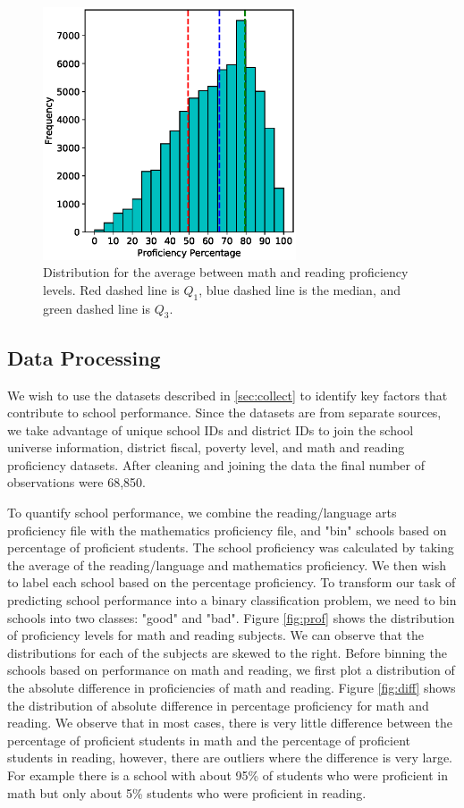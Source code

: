 \begin{figure} 
	\includegraphics[width=7.5cm]{images/prof_avg}
	\caption{Distribution for the average between math and reading proficiency levels. Red dashed line is $Q_1$, blue dashed line is the median, and green dashed line is $Q_3$.}
	\label{fig:avgprof}
\end{figure}

\subsection{Data Processing} \label{sec:processing}

We wish to use the datasets described in \ref{sec:collect} to identify key factors that contribute to school performance. Since the datasets are from separate sources, we take advantage of unique school IDs and district IDs to join the school universe information, district fiscal, poverty level, and math and reading proficiency datasets. After cleaning and joining the data the final number of observations were 68,850.

To quantify school performance, we combine the reading/language arts proficiency file with the mathematics proficiency file, and "bin" schools based on percentage of proficient students. The school proficiency was calculated by taking the average of the reading/language and mathematics proficiency. We then wish to label each school based on the percentage proficiency. To transform our task of predicting school performance into a binary classification problem, we need to bin schools into two classes: "good" and "bad". Figure \ref{fig:prof} shows the distribution of proficiency levels for math and reading subjects. We can observe that the distributions for each of the subjects are skewed to the right. Before binning the schools based on performance on math and reading, we first plot a distribution of the absolute difference in proficiencies of math and reading. Figure \ref{fig:diff} shows the distribution of absolute difference in percentage proficiency for math and reading. We observe that in most cases, there is very little difference between the percentage of proficient students in math and the percentage of proficient students in reading, however, there are outliers where the difference is very large. For example there is a school with about 95\% of students who were proficient in math but only about 5\% students who were proficient in reading.

